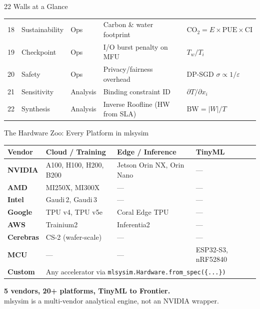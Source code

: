 \begin{frame}{22 Walls at a Glance}
\begin{tabular}{@{}rllll@{}}
18 & Sustainability & Ops      & Carbon \& water footprint     & $\text{CO}_2 = E \times \text{PUE} \times \text{CI}$ \\
19 & Checkpoint    & Ops       & I/O burst penalty on MFU      & $T_w / T_i$ \\
20 & Safety        & Ops       & Privacy/fairness overhead     & DP-SGD $\sigma \propto 1/\varepsilon$ \\
\midrule
21 & Sensitivity   & Analysis  & Binding constraint ID         & $\partial T / \partial x_i$ \\
22 & Synthesis     & Analysis  & Inverse Roofline (HW from SLA) & $\text{BW} = |W| / T$ \\
\bottomrule
\end{tabular}
\end{frame}

\begin{frame}{The Hardware Zoo: Every Platform in mlsysim}

\centering
\scriptsize
\setlength{\tabcolsep}{3pt}
\begin{tabular}{@{}llll@{}}
\toprule
\textbf{Vendor} & \textbf{Cloud / Training} & \textbf{Edge / Inference} & \textbf{TinyML} \\
\midrule
\textbf{NVIDIA}   & A100, H100, H200, B200        & Jetson Orin NX, Orin Nano & --- \\
\textbf{AMD}      & MI250X, MI300X                 & ---                       & --- \\
\textbf{Intel}    & Gaudi\,2, Gaudi\,3             & ---                       & --- \\
\textbf{Google}   & TPU v4, TPU v5e                & Coral Edge TPU            & --- \\
\textbf{AWS}      & Trainium2                      & Inferentia2               & --- \\
\textbf{Cerebras} & CS-2 (wafer-scale)             & ---                       & --- \\
\textbf{MCU}      & ---                            & ---                       & ESP32-S3, nRF52840 \\
\textbf{Custom}   & \multicolumn{3}{l}{Any accelerator via \texttt{mlsysim.Hardware.from\_spec(\{...\})}} \\
\bottomrule
\end{tabular}

\vspace{0.5em}
\small
\textbf{5 vendors, 20+ platforms, TinyML to Frontier.}\\[0.2em]
\alert{mlsysim is a multi-vendor analytical engine, not an NVIDIA wrapper.}
\end{frame}

